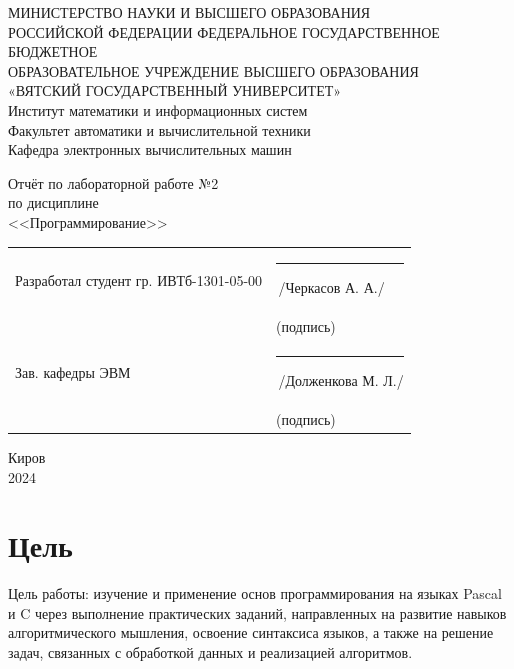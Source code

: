 \documentclass[oneside,a4paper,14pt]{extarticle}
\begin{document}
\newpage
\thispagestyle{empty}
\begin{center}
	МИНИСТЕРСТВО НАУКИ И ВЫСШЕГО ОБРАЗОВАНИЯ\\
	РОССИЙСКОЙ ФЕДЕРАЦИИ
	ФЕДЕРАЛЬНОЕ ГОСУДАРСТВЕННОЕ БЮДЖЕТНОЕ\\
	ОБРАЗОВАТЕЛЬНОЕ
	УЧРЕЖДЕНИЕ ВЫСШЕГО ОБРАЗОВАНИЯ\\
	«ВЯТСКИЙ ГОСУДАРСТВЕННЫЙ УНИВЕРСИТЕТ»\\
	Институт математики и информационных систем\\
	Факультет автоматики и вычислительной техники\\
	Кафедра электронных вычислительных машин
\end{center}
\vspace{20mm}

\begin{center}
	Отчёт по лабораторной работе №2\\
	по дисциплине\\
	<<Программирование>>\\
\end{center}
\vspace{40mm}
\noindent
\begin{tabular}{ll}
	Разработал студент гр. ИВТб-1301-05-00 & \rule[-1mm]{30mm}{0.10mm}\,/Черкасов А. А./   \\
	                                       & \hspace{8mm}\footnotesize(подпись)            \\

	Зав. кафедры ЭВМ                & \rule[-1mm]{30mm}{0.10mm}\,/Долженкова М. Л./ \\
	                                       & \hspace{8mm}\footnotesize(подпись)            \\
\end{tabular}

\vfill
\begin{center}
	Киров\\
	2024
\end{center}

\newpage\thispagestyle{plain}

\section*{Цель}

\sloppy Цель работы: изучение и применение основ программирования на языках Pascal и C через выполнение практических заданий, направленных на развитие навыков алгоритмического мышления, освоение синтаксиса языков, а также на решение задач, связанных с обработкой данных и реализацией алгоритмов.
\end{document}
